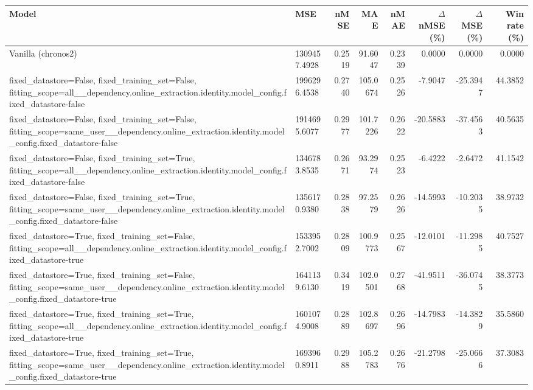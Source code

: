\begin{tabular}{llrrrrrr}
\toprule
Model & MSE & nMSE & MAE & nMAE & $\Delta$ nMSE (\%) & $\Delta$ MSE (\%) & Win rate (\%) \\
\midrule
Vanilla (chronos2) & 1309457.4928 & 0.2519 & 91.6047 & 0.2339 & 0.0000 & 0.0000 & 0.0000 \\
fixed\_datastore=False, fixed\_training\_set=False, fitting\_scope=all\_\_dependency.online\_extraction.identity.model\_config.fixed\_datastore-false & 1996296.4538 & 0.2740 & 105.0674 & 0.2526 & -7.9047 & -25.3947 & 44.3852 \\
fixed\_datastore=False, fixed\_training\_set=False, fitting\_scope=same\_user\_\_dependency.online\_extraction.identity.model\_config.fixed\_datastore-false & 1914695.6077 & 0.2977 & 101.7226 & 0.2622 & -20.5883 & -37.4563 & 40.5635 \\
fixed\_datastore=False, fixed\_training\_set=True, fitting\_scope=all\_\_dependency.online\_extraction.identity.model\_config.fixed\_datastore-false & 1346783.8535 & 0.2671 & 93.2974 & 0.2523 & -6.4222 & -2.6472 & 41.1542 \\
fixed\_datastore=False, fixed\_training\_set=True, fitting\_scope=same\_user\_\_dependency.online\_extraction.identity.model\_config.fixed\_datastore-false & 1356170.9380 & 0.2838 & 97.2579 & 0.2626 & -14.5993 & -10.2035 & 38.9732 \\
fixed\_datastore=True, fixed\_training\_set=False, fitting\_scope=all\_\_dependency.online\_extraction.identity.model\_config.fixed\_datastore-true & 1533952.7002 & 0.2809 & 100.9773 & 0.2567 & -12.0101 & -11.2985 & 40.7527 \\
fixed\_datastore=True, fixed\_training\_set=False, fitting\_scope=same\_user\_\_dependency.online\_extraction.identity.model\_config.fixed\_datastore-true & 1641139.6130 & 0.3419 & 102.0501 & 0.2768 & -41.9511 & -36.0745 & 38.3773 \\
fixed\_datastore=True, fixed\_training\_set=True, fitting\_scope=all\_\_dependency.online\_extraction.identity.model\_config.fixed\_datastore-true & 1601074.9008 & 0.2889 & 102.8697 & 0.2696 & -14.7983 & -14.3829 & 35.5860 \\
fixed\_datastore=True, fixed\_training\_set=True, fitting\_scope=same\_user\_\_dependency.online\_extraction.identity.model\_config.fixed\_datastore-true & 1693960.8911 & 0.2988 & 105.2783 & 0.2676 & -21.2798 & -25.0666 & 37.3083 \\
\bottomrule
\end{tabular}
